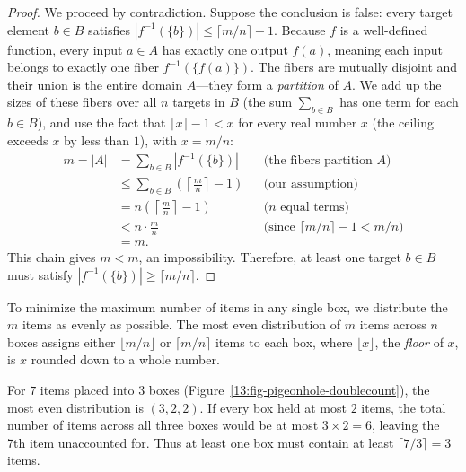 \begin{proof}
We proceed by contradiction. Suppose the conclusion is false: every target element $b \in B$ satisfies $|f^{-1}(\{b\})| \le \lceil m/n \rceil - 1$.
Because $f$ is a well-defined function, every input $a \in A$ has exactly one output $f(a)$, meaning each input belongs to exactly one fiber $f^{-1}(\{f(a)\})$. The fibers are mutually disjoint and their union is the entire domain $A$---they form a \emph{partition} of $A$. We add up the sizes of these fibers over all $n$ targets in $B$ (the sum $\sum_{b \in B}$ has one term for each $b \in B$), and use the fact that $\lceil x \rceil - 1 < x$ for every real number $x$ (the ceiling exceeds $x$ by less than $1$), with $x = m/n$:
\begin{align*}
m = |A| &= \sum_{b \in B} |f^{-1}(\{b\})| && \text{(the fibers partition $A$)} \\
&\le \sum_{b \in B} \left( \left\lceil \frac{m}{n} \right\rceil - 1 \right) && \text{(our assumption)} \\
&= n \left( \left\lceil \frac{m}{n} \right\rceil - 1 \right) && \text{($n$ equal terms)} \\
&< n \cdot \frac{m}{n} && \text{(since $\lceil m/n \rceil - 1 < m/n$)} \\
&= m.
\end{align*}
This chain gives $m < m$, an impossibility. Therefore, at least one target $b \in B$ must satisfy $|f^{-1}(\{b\})| \ge \lceil m/n \rceil$.
\end{proof}

\begin{intuitionbox}
To minimize the maximum number of items in any single box, we distribute the $m$ items as evenly as possible. The most even distribution of $m$ items across $n$ boxes assigns either $\lfloor m/n \rfloor$ or $\lceil m/n \rceil$ items to each box, where $\lfloor x \rfloor$, the \emph{floor} of $x$, is $x$ rounded down to a whole number.

For $7$ items placed into $3$ boxes (Figure~\ref{13:fig-pigeonhole-doublecount}), the most even distribution is $(3, 2, 2)$. If every box held at most $2$ items, the total number of items across all three boxes would be at most $3 \times 2 = 6$, leaving the 7th item unaccounted for. Thus at least one box must contain at least $\lceil 7/3 \rceil = 3$ items.
\end{intuitionbox}

